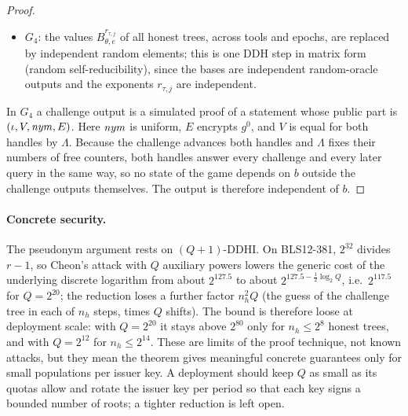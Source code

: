\begin{proof}
\begin{itemize}[leftmargin=*]
\item $G_4$: the values $B_{\theta,e}^{r_{\tau,j}}$ of all honest trees, across tools and epochs, are replaced by independent random elements; this is one DDH step in matrix form (random self-reducibility), since the bases are independent random-oracle outputs and the exponents $r_{\tau,j}$ are independent.
\end{itemize}
In $G_4$ a challenge output is a simulated proof of a statement whose public part is $(\iota,V,\mathit{nym},E)$. Here $\mathit{nym}$ is uniform, $E$ encrypts $g^0$, and $V$ is equal for both handles by $\Lambda$. Because the challenge advances both handles and $\Lambda$ fixes their numbers of free counters, both handles answer every challenge and every later query in the same way, so no state of the game depends on $b$ outside the challenge outputs themselves. The output is therefore independent of $b$.
\end{proof}

\paragraph{Concrete security.} The pseudonym argument rests on $(Q+1)$-DDHI. On BLS12-381, $2^{32}$ divides $r-1$, so Cheon's attack with $Q$ auxiliary powers lowers the generic cost of the underlying discrete logarithm from about $2^{127.5}$ to about $2^{127.5-\frac12\log_2 Q}$, i.e.\ $2^{117.5}$ for $Q=2^{20}$; the reduction loses a further factor $n_h^2Q$ (the guess of the challenge tree in each of $n_h$ steps, times $Q$ shifts). The bound is therefore loose at deployment scale: with $Q=2^{20}$ it stays above $2^{80}$ only for $n_h\le 2^{8}$ honest trees, and with $Q=2^{12}$ for $n_h\le 2^{14}$. These are limits of the proof technique, not known attacks, but they mean the theorem gives meaningful concrete guarantees only for small populations per issuer key. A deployment should keep $Q$ as small as its quotas allow and rotate the issuer key per period so that each key signs a bounded number of roots; a tighter reduction is left open.

